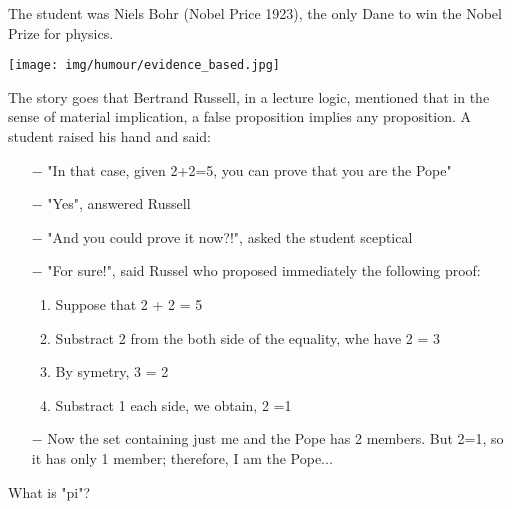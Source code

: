 The student was Niels Bohr (Nobel Price 1923), the only Dane to win the Nobel Prize for physics. 
\begin{center}\underline{\hspace{5 cm}}\end{center}
\begin{center}
	\texttt{[image: img/humour/evidence\_based.jpg]}	
\end{center}
\pagebreak
The story goes that Bertrand Russell, in a lecture logic, mentioned that in the sense of material implication, a false proposition implies any proposition. A student raised his hand and said:

\begin{itemize}	 
	\item[$-$] "In that case, given 2+2=5, you can prove that you are the Pope"

	\item[$-$] "Yes", answered Russell

	\item[$-$] "And you could prove it now?!", asked the student sceptical

	\item[$-$] "For sure!", said Russel who proposed immediately the following proof:

	\begin{enumerate}
		\item Suppose that 2 + 2 = 5

		\item Substract 2 from the both side of the equality, whe have 2 = 3

		\item By symetry, 3 = 2

		\item Substract 1 each side, we obtain, 2 =1
	\end{enumerate}

	\item[$-$] Now the set containing just me and the Pope has 2 members. But 2=1, so it has only 1 member; therefore, I am the Pope...
\end{itemize}
	\begin{center}\underline{\hspace{5 cm}}\end{center}
	
What is "pi"?

